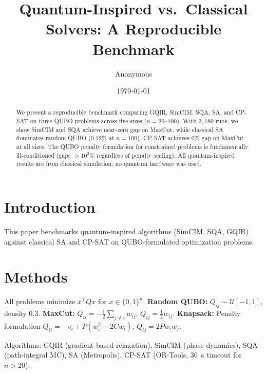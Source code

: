 \documentclass[10pt,twocolumn]{article}
\title{Quantum-Inspired vs.\ Classical Solvers: A Reproducible Benchmark}
\author{Anonymous}
\date{\today}
\begin{document}
\maketitle
\begin{abstract}
We present a reproducible benchmark comparing GQIR, SimCIM, SQA, SA, and CP-SAT on three QUBO problems across five sizes ($n=20$--$100$). With $3{,}180$ runs, we show SimCIM and SQA achieve near-zero gap on MaxCut, while classical SA dominates random QUBO ($0.12\%$ at $n=100$). CP-SAT achieves $0\%$ gap on MaxCut at all sizes. The QUBO penalty formulation for constrained problems is fundamentally ill-conditioned (gaps $>10^3\%$ regardless of penalty scaling). All quantum-inspired results are from classical simulation; no quantum hardware was used.
\end{abstract}

\section{Introduction}
This paper benchmarks quantum-inspired algorithms (SimCIM, SQA, GQIR) against classical SA and CP-SAT on QUBO-formulated optimization problems.

\section{Methods}
All problems minimize $x^\top Qx$ for $x\in\{0,1\}^n$.
\textbf{Random QUBO:} $Q_{ij}\sim\mathcal{U}[-1,1]$, density 0.3.
\textbf{MaxCut:} $Q_{ii}=-\frac12\sum_{j\neq i}w_{ij}$, $Q_{ij}=\frac12 w_{ij}$.
\textbf{Knapsack:} Penalty formulation $Q_{ii}=-v_i+P(w_i^2-2Cw_i)$, $Q_{ij}=2P w_i w_j$.

Algorithms: GQIR (gradient-based relaxation), SimCIM (phase dynamics), SQA (path-integral MC), SA (Metropolis), CP-SAT (OR-Tools, 30~s timeout for $n>20$).
\end{document}
